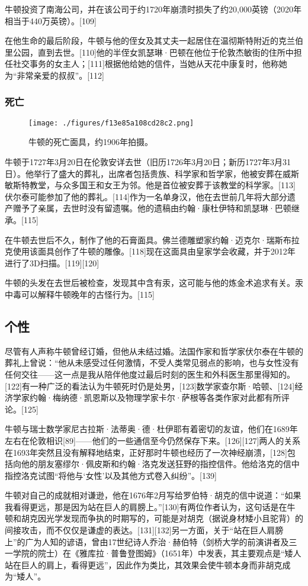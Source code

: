 牛顿投资了南海公司，并在该公司于约1720年崩溃时损失了约20,000英镑（2020年相当于440万英镑）。[109]

在他生命的最后阶段，牛顿与他的侄女及其丈夫一起居住在温彻斯特附近的克兰伯里公园，直到去世。[110]他的半侄女凯瑟琳·巴顿在他位于伦敦杰敏街的住所中担任社交事务的女主人；[111]根据他给她的信件，当她从天花中康复时，他称她为“非常亲爱的叔叔”。[112]
\subsubsection{死亡}
\begin{figure}[ht]
\centering
\texttt{[image: ./figures/f13e85a108cd28c2.png]}
\caption{牛顿的死亡面具，约1906年拍摄。} \label{fig_Newton_10}
\end{figure}
牛顿于1727年3月20日在伦敦安详去世（旧历1726年3月20日；新历1727年3月31日）。他举行了盛大的葬礼，出席者包括贵族、科学家和哲学家，他被安葬在威斯敏斯特教堂，与众多国王和女王为邻。他是首位被安葬于该教堂的科学家。[113]伏尔泰可能参加了他的葬礼。[114]作为一名单身汉，他在去世前几年将大部分遗产赠予了亲属，去世时没有留遗嘱。他的遗稿由约翰·康杜伊特和凯瑟琳·巴顿继承。[115]

在牛顿去世后不久，制作了他的石膏面具。佛兰德雕塑家约翰·迈克尔·瑞斯布拉克使用该面具创作了牛顿的雕像。[118]现在这面具由皇家学会收藏，并于2012年进行了3D扫描。[119][120]

牛顿的头发在去世后被检查，发现其中含有汞，这可能与他的炼金术追求有关。汞中毒可以解释牛顿晚年的古怪行为。[115]
\subsection{个性}  
尽管有人声称牛顿曾经订婚，但他从未结过婚。法国作家和哲学家伏尔泰在牛顿的葬礼上曾说：“他从未感受过任何激情，不受人类常见弱点的影响，也与女性没有任何交往——这一点是我从陪伴他度过最后时刻的医生和外科医生那里得知的。[122]有一种广泛的看法认为牛顿死时仍是处男，[123]数学家查尔斯·哈顿、[124]经济学家约翰·梅纳德·凯恩斯以及物理学家卡尔·萨根等各类作家对此都有所评论。[125]

牛顿与瑞士数学家尼古拉斯·法蒂奥·德·杜伊耶有着密切的友谊，他们在1689年左右在伦敦相识[89]——他们的一些通信至今仍然保存下来。[126][127]两人的关系在1693年突然且没有解释地结束，正好那时牛顿也经历了一次神经崩溃，[128]包括向他的朋友塞缪尔·佩皮斯和约翰·洛克发送狂野的指控信件。他给洛克的信中指控洛克试图“将他与‘女性’以及其他方式卷入纠纷”。[139]

牛顿对自己的成就相对谦逊，他在1676年2月写给罗伯特·胡克的信中说道：“如果我看得更远，那是因为站在巨人的肩膀上。”[130]有两位作者认为，这句话是在牛顿和胡克因光学发现而争执的时期写的，可能是对胡克（据说身材矮小且驼背）的间接攻击，而不仅仅是谦虚的表达。[131][132]另一方面，关于“站在巨人肩膀上”的广为人知的谚语，曾由17世纪诗人乔治·赫伯特（剑桥大学的前演讲者及三一学院的院士）在《雅库拉·普鲁登图姆》（1651年）中发表，其主要观点是“矮人站在巨人的肩上，看得更远”，因此作为类比，其效果会使牛顿本身而非胡克成为“矮人”。

